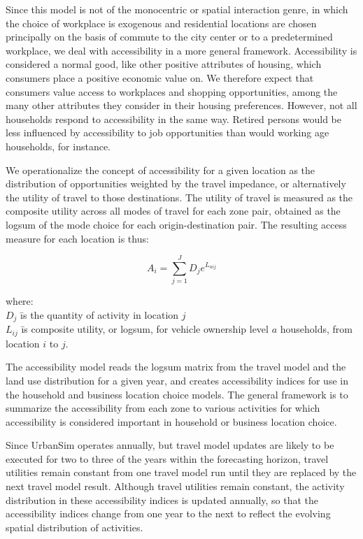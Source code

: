 Since this model is not of the monocentric or spatial interaction
genre, in which the choice of workplace is exogenous and
residential locations are chosen principally on the basis of
commute to the city center or to a predetermined workplace, we
deal with accessibility in a more general framework. Accessibility
is considered a normal good, like other positive attributes of
housing, which consumers place a positive economic value on.  We
therefore expect that consumers value access to workplaces and
shopping opportunities, among the many other attributes they
consider in their housing preferences. However, not all households
respond to accessibility in the same way. Retired persons would be
less influenced by accessibility to job opportunities than would
working age households, for instance.

We operationalize the concept of accessibility for a given
location as the distribution of opportunities weighted by the
travel impedance, or alternatively the utility of travel to those
destinations.  The utility of travel is measured as the composite
utility across all modes of travel for each zone pair, obtained as
the logsum of the mode choice for each origin-destination pair.
The resulting access measure for each location is thus:

\begin{equation}
A_i = \sum_{j=1}^{J} D_j e^{L_{aij}} \end{equation}

\begin{tabbing}

where: \= \\
\> $D_j$ \= is the quantity of activity in location $j$ \\

\> $L_{ij}$ \=is composite utility, or logsum, for vehicle
ownership
level $a$ households, from \\
\> \> location $i$ to $j$.

\end{tabbing}

The accessibility model reads the logsum matrix from the travel
model and the land use distribution for a given year, and creates
accessibility indices for use in the household and business
location choice models. The general framework is to summarize the
accessibility from each zone to various activities for which
accessibility is considered important in household or business
location choice.

Since UrbanSim operates annually, but travel model updates are
likely to be executed for two to three of the years within the
forecasting horizon, travel utilities remain constant from one
travel model run until they are replaced by the next travel model
result. Although travel utilities remain constant, the activity
distribution in these accessibility indices is updated annually,
so that the accessibility indices change from one year to the next
to reflect the evolving spatial distribution of activities.


